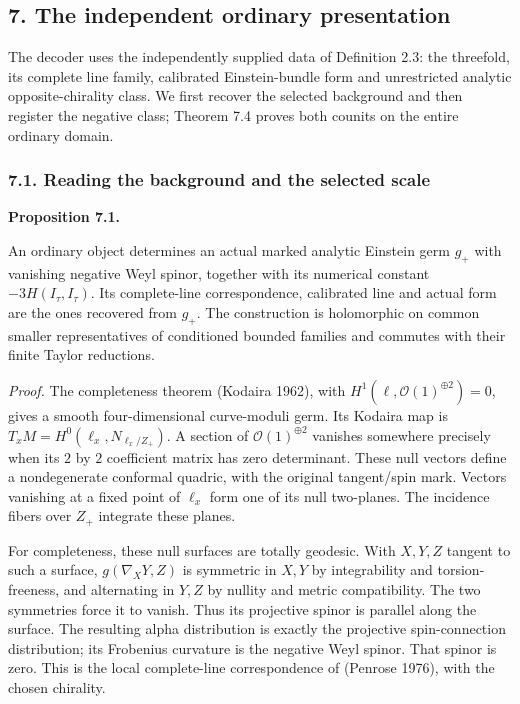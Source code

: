 \documentclass[
  english,
  11pt,
  reqno]{amsart}
\makeatletter
\newcommand{\pandocstatementheading}[1]{%
  \par\addpenalty{\@beginparpenalty}%
  \addvspace{.5\baselineskip plus .2\baselineskip minus .2\baselineskip}%
  {\normalfont\bfseries #1\par}%
  \nobreak\@afterindenttrue\@afterheading
}
\makeatother
\begin{document}
\protect{}\label{sec:gg-ordinary-comparison}

\subsection{7. The independent ordinary
presentation}\label{the-independent-ordinary-presentation}

The decoder uses the independently supplied data of Definition 2.3: the
threefold, its complete line family, calibrated Einstein-bundle form and
unrestricted analytic opposite-chirality class. We first recover the
selected background and then register the negative class; Theorem 7.4
proves both counits on the entire ordinary domain.

\protect{}\label{sec:gg-ordinary-background}

\subsubsection{7.1. Reading the background and the selected
scale}\label{reading-the-background-and-the-selected-scale}

\pandocstatementheading{\protect{}\label{prop:gg-independent-ordinary-background}Proposition 7.1.}

An ordinary object determines an actual marked analytic Einstein germ
\(g_+\) with vanishing negative Weyl spinor, together with its numerical
constant \(-3H(I_\tau,I_\tau)\). Its complete-line correspondence,
calibrated line and actual form are the ones recovered from \(g_+\). The
construction is holomorphic on common smaller representatives of
conditioned bounded families and commutes with their finite Taylor
reductions.

\emph{Proof.} The completeness theorem (Kodaira 1962), with
\(H^1(\ell,\mathcal O(1)^{\oplus2})=0\), gives a smooth four-dimensional
curve-moduli germ. Its Kodaira map is
\(T_xM=H^0(\ell_x,N_{\ell_x/Z_+})\). A section of
\(\mathcal O(1)^{\oplus2}\) vanishes somewhere precisely when its \(2\)
by \(2\) coefficient matrix has zero determinant. These null vectors
define a nondegenerate conformal quadric, with the original tangent/spin
mark. Vectors vanishing at a fixed point of \(\ell_x\) form one of its
null two-planes. The incidence fibers over \(Z_+\) integrate these
planes.

For completeness, these null surfaces are totally geodesic. With
\(X,Y,Z\) tangent to such a surface, \(g(\nabla_XY,Z)\) is symmetric in
\(X,Y\) by integrability and torsion-freeness, and alternating in
\(Y,Z\) by nullity and metric compatibility. The two symmetries force it
to vanish. Thus its projective spinor is parallel along the surface. The
resulting alpha distribution is exactly the projective spin-connection
distribution; its Frobenius curvature is the negative Weyl spinor. That
spinor is zero. This is the local complete-line correspondence of
(Penrose 1976), with the chosen chirality.
\end{document}
